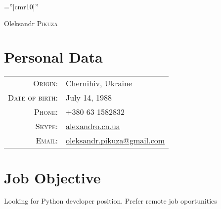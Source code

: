 \documentclass[a4paper,10pt]{article}
\begin{document}
\pagestyle{empty} %

\font\fb=''[cmr10]'' %

\par{\centering
  {\Huge Oleksandr \textsc{Pikuza}
}\bigskip\par}

\section{Personal Data}

\begin{tabular}{rl}
    \textsc{Origin:}   	& Chernihiv, Ukraine \\
    \textsc{Date of birth:}    & July 14, 1988 \\
    \textsc{Phone:}     & +380 63 1582832 \\
    \textsc{Skype:}	& \href{skype:alexandro.cn.ua}{alexandro.cn.ua} \\
    \textsc{Email:}     & \href{mailto:oleksandr.pikuza@gmail.com}{oleksandr.pikuza@gmail.com} \\
\end{tabular}

\section{Job Objective}
Looking for Python developer position. Prefer remote job oportunities


\end{document}
